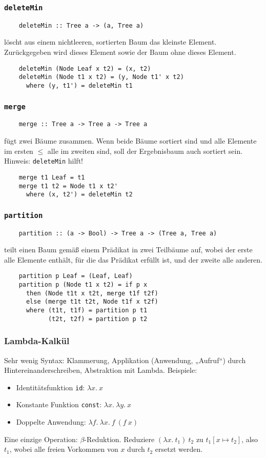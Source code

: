 \documentclass{beamer}
\begin{document}
\begin{frame}[fragile]
  \frametitle{\lstinline{deleteMin}}
  \begin{lstlisting}
    deleteMin :: Tree a -> (a, Tree a)
  \end{lstlisting}
  löscht aus einem nichtleeren, sortierten Baum das kleinste Element.
  Zurückgegeben wird dieses Element sowie der Baum ohne dieses Element.
  \pause
  \begin{lstlisting}
    deleteMin (Node Leaf x t2) = (x, t2)
    deleteMin (Node t1 x t2) = (y, Node t1' x t2)
      where (y, t1') = deleteMin t1
  \end{lstlisting}
\end{frame}

\begin{frame}[fragile]
  \frametitle{\lstinline{merge}}
  \begin{lstlisting}
    merge :: Tree a -> Tree a -> Tree a
  \end{lstlisting}
  fügt zwei Bäume zusammen.
  Wenn beide Bäume sortiert sind und alle Elemente im ersten $≤$ alle im zweiten sind,
  soll der Ergebnisbaum auch sortiert sein.
  Hinweis: \lstinline{deleteMin} hilft!
  \pause
  \begin{lstlisting}
    merge t1 Leaf = t1
    merge t1 t2 = Node t1 x t2'
      where (x, t2') = deleteMin t2
  \end{lstlisting}
\end{frame}

\begin{frame}[fragile]
  \frametitle{\lstinline{partition}}
  \begin{lstlisting}
    partition :: (a -> Bool) -> Tree a -> (Tree a, Tree a)
  \end{lstlisting}
  teilt einen Baum gemäß einem Prädikat in zwei Teilbäume auf,
  wobei der erste alle Elemente enthält, für die das Prädikat erfüllt ist,
  und der zweite alle anderen.
  \pause
  \begin{lstlisting}
    partition p Leaf = (Leaf, Leaf)
    partition p (Node t1 x t2) = if p x
      then (Node t1t x t2t, merge t1f t2f)
      else (merge t1t t2t, Node t1f x t2f)
      where (t1t, t1f) = partition p t1
            (t2t, t2f) = partition p t2
  \end{lstlisting}
\end{frame}

\begin{frame}
  \frametitle{Lambda-Kalkül}
  Sehr wenig Syntax: Klammerung, Applikation (Anwendung, „Aufruf“) durch Hintereinanderschreiben, Abstraktion mit Lambda.
  Beispiele:
  \begin{itemize}
  \item Identitätsfunktion \lstinline{id}: $λx.~x$
  \item Konstante Funktion \lstinline{const}: $λx.~λy.~x$
  \item Doppelte Anwendung: $λf.~λx.~f~(f~x)$
  \end{itemize}
  Eine einzige Operation: $β$-Reduktion.
  Reduziere $(λx.~t_1)~t_2$ zu $t_1[x \mapsto t_2]$,
  also $t_1$, wobei alle freien Vorkommen von $x$ durch $t_2$ ersetzt werden.
\end{frame}
\end{document}
